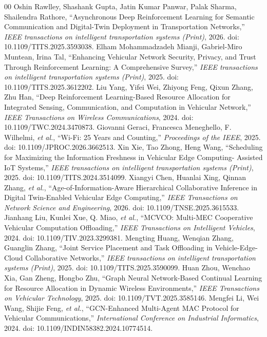 \documentclass[journal]{IEEEtran}
\begin{document}
\begin{thebibliography}{00}
 Oshin Rawlley, Shashank Gupta, Jatin Kumar Panwar, Palak Sharma, Shailendra Rathore, ``Asynchronous Deep Reinforcement Learning for Semantic Communication and Digital-Twin Deployment in Transportation Networks,'' \emph{IEEE transactions on intelligent transportation systems (Print)}, 2026. doi: 10.1109/TITS.2025.3593038.
 Elham Mohammadzadeh Mianji, Gabriel-Miro Muntean, Irina Tal, ``Enhancing Vehicular Network Security, Privacy, and Trust Through Reinforcement Learning: A Comprehensive Survey,'' \emph{IEEE transactions on intelligent transportation systems (Print)}, 2025. doi: 10.1109/TITS.2025.3612202.
 Liu Yang, Yifei Wei, Zhiyong Feng, Qixun Zhang, Zhu Han, ``Deep Reinforcement Learning-Based Resource Allocation for Integrated Sensing, Communication, and Computation in Vehicular Network,'' \emph{IEEE Transactions on Wireless Communications}, 2024. doi: 10.1109/TWC.2024.3470873.
 Giovanni Geraci, Francesca Meneghello, F. Wilhelmi, \emph{et al.}, ``Wi-Fi: 25 Years and Counting,'' \emph{Proceedings of the IEEE}, 2025. doi: 10.1109/JPROC.2026.3662513.
 Xin Xie, Tao Zhong, Heng Wang, ``Scheduling for Maximizing the Information Freshness in Vehicular Edge Computing- Assisted IoT Systems,'' \emph{IEEE transactions on intelligent transportation systems (Print)}, 2025. doi: 10.1109/TITS.2024.3514099.
 Xiangyi Chen, Huanlai Xing, Qinnan Zhang, \emph{et al.}, ``Age-of-Information-Aware Hierarchical Collaborative Inference in Digital Twin-Enabled Vehicular Edge Computing,'' \emph{IEEE Transactions on Network Science and Engineering}, 2026. doi: 10.1109/TNSE.2025.3615533.
 Jianhang Liu, Kunlei Xue, Q. Miao, \emph{et al.}, ``MCVCO: Multi-MEC Cooperative Vehicular Computation Offloading,'' \emph{IEEE Transactions on Intelligent Vehicles}, 2024. doi: 10.1109/TIV.2023.3299381.
 Mengting Huang, Wenqian Zhang, Guanglin Zhang, ``Joint Service Placement and Task Offloading in Vehicle-Edge-Cloud Collaborative Networks,'' \emph{IEEE transactions on intelligent transportation systems (Print)}, 2025. doi: 10.1109/TITS.2025.3590099.
 Huan Zhou, Wenchao Xia, Gan Zheng, Hongbo Zhu, ``Graph Neural Network-Based Continual Learning for Resource Allocation in Dynamic Wireless Environments,'' \emph{IEEE Transactions on Vehicular Technology}, 2025. doi: 10.1109/TVT.2025.3585146.
 Mengfei Li, Wei Wang, Shijie Feng, \emph{et al.}, ``GCN-Enhanced Multi-Agent MAC Protocol for Vehicular Communications,'' \emph{International Conference on Industrial Informatics}, 2024. doi: 10.1109/INDIN58382.2024.10774514.

\end{thebibliography}
\end{document}
